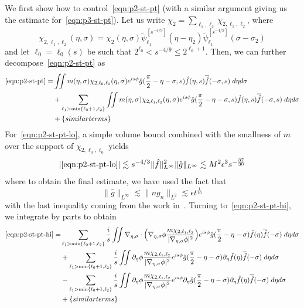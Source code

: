 \documentclass[letterpaper, reqno,final]{amsart}
\newcommand{\fhPi}{\frac{\pi}{2}}
\newcommand{\deles}{\nabla_{\eta,\sigma}}
\newcommand{\btext}[1]{\left\{\textup{#1}\right\}}
\newcommand{\bsim}{\btext{similar terms}}
\begin{document}
We first show how to control~\eqref{eqn:p2-st-pt} (with a similar argument giving us the estimate for~\eqref{eqn:p3-st-pt}).  Let us write $\chi_{2} = \sum_{\ell_1,\ell_2} \chi_{2,\ell_1,\ell_2}$, where
\begin{equation*}
    \chi_{2,\ell_1,\ell_2}(\eta,\sigma) = \chi_2(\eta,\sigma) \tilde{\psi}^{[s^{-4/9}]}_{\ell_1}(\eta - \eta_2) \tilde{\psi}^{[s^{-4/9}]}_{\ell_1}(\sigma - \sigma_2)
\end{equation*}
and let $\ell_0 = \ell_0(s)$ be such that $2^{\ell_0} < s^{-4/9} \leq 2^{\ell_0+1}$.  Then, we can further decompose~\eqref{eqn:p2-st-pt} as
\begin{subequations}\begin{align}
    \eqref{eqn:p2-st-pt} =&  \iint m(\eta,\sigma) \chi_{2,\ell_0,\ell_0}(\eta,\sigma) e^{is\phi} \hat{g}(\fhPi-\eta-\sigma,s) \hat{f}(\eta,s) \overline{\hat{f}}(-\sigma,s) \;d\eta d\sigma\label{eqn:p2-st-pt-lo}\\
    &+ \sum_{\substack{\ell_1 > \min\{\ell_0+1, \ell_2\}}}\iint m(\eta,\sigma) \chi_{2,\ell_1,\ell_2}(\eta,\sigma) e^{is\phi} \hat{g}(\fhPi-\eta-\sigma,s) \hat{f}(\eta,s) \overline{\hat{f}}(-\sigma,s) \;d\eta d\sigma\label{eqn:p2-st-pt-hi}\\
    &+ \bsim\notag
\end{align}\end{subequations}
For~\eqref{eqn:p2-st-pt-lo}, a simple volume bound combined with the smallness of $m$ over the support of $\chi_{2,\ell_0,\ell_0}$ yields
\begin{equation*}
    |\eqref{eqn:p2-st-pt-lo}| \lesssim s^{-4/3} \lVert \hat{f} \rVert_{L^\infty}^2\lVert \hat{g} \rVert_{L^\infty} \lesssim M^2\epsilon^3 s^{-\frac{37}{30}} 
\end{equation*}
where to obtain the final estimate, we have used the fact that 
$$\lVert \hat{g} \rVert_{L^\infty} \lesssim \lVert ng_n \rVert_{L^2} \lesssim \epsilon t^{\frac{1}{10}}$$
with the last inequality coming from the work in~.  Turning to~\eqref{eqn:p2-st-pt-hi}, we integrate by parts to obtain
\begin{subequations}\begin{align}
    \eqref{eqn:p2-st-pt-hi} =& \sum_{\substack{\ell_1 > \min\{\ell_0+1, \ell_2\}}} \frac{i}{s} \iint \deles \cdot \Bigl(\deles \phi \frac{m \chi_{2,\ell_1,\ell_2}}{|\deles \phi|^2}\Bigr) e^{is\phi} \hat{g}(\fhPi-\eta-\sigma) \hat{f}(\eta) \overline{\hat{f}}(-\sigma) \;d\eta d\sigma \label{eqn:p2-st-pt-hi-1}\\
    &+ \sum_{\substack{\ell_1 > \min\{\ell_0+1, \ell_2\}}}  \frac{i}{s} \iint \partial_\eta \phi \frac{m \chi_{2,\ell_1,\ell_2}}{|\deles \phi|^2} e^{is\phi} \hat{g}(\fhPi-\eta-\sigma) \partial_\eta \hat{f}(\eta) \overline{\hat{f}}(-\sigma) \;d\eta d\sigma \label{eqn:p2-st-pt-hi-2}\\
    &- \sum_{\substack{\ell_1 > \min\{\ell_0+1, \ell_2\}}}  \frac{i}{s} \iint \partial_\eta \phi \frac{m \chi_{2,\ell_1,\ell_2}}{|\deles \phi|^2} e^{is\phi} \partial_\eta \hat{g}(\fhPi-\eta-\sigma) \partial_\eta \hat{f}(\eta) \overline{\hat{f}}(-\sigma) \;d\eta d\sigma \label{eqn:p2-st-pt-hi-3}\\
    &+ \bsim \notag
\end{align}
\end{subequations}
\end{document}
